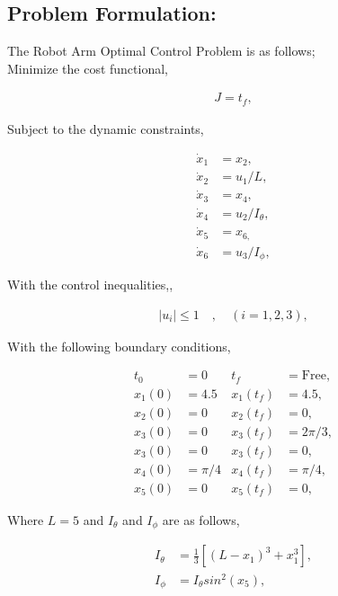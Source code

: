 \documentclass[11pt,usenames]{article}
\begin{document}
	
	\subsection{Problem Formulation:}
	
	The Robot Arm Optimal Control Problem is as follows;\\
	
	Minimize the cost functional,
	
	\begin{align} 
	J = t_{f},
	\end{align}
	
	Subject to the dynamic constraints,
	
	\begin{align}
	\dot x_{1} &= x_{2}, \nonumber\\
	\dot x_{2} &= u_{1}/L, \nonumber\\
	\dot x_{3} &= x_{4},\\
	\dot x_{4} &= u_{2}/I_{\theta}, \nonumber\\
	\dot x_{5} &= x_{6,} \nonumber\\
	\dot x_{6} &= u_{3}/I_{\phi}, \nonumber
	\end{align}
	
	With the control inequalities,,
	
	\begin{align} 
	|u_{i}| \leq 1 \quad , \quad (i=1,2,3),
	\end{align}
	
	With the following boundary conditions,
	
	\begin{align}
	t_{0} &= 0 & t_{f} &= \text{Free}, \nonumber \\
	x_{1}(0) &= 4.5 & x_{1}(t_{f}) &= 4.5, \nonumber \\
	x_{2}(0) &= 0 & x_{2}(t_{f}) &= 0,  \nonumber\\
	x_{3}(0) &= 0 & x_{3}(t_{f}) &= 2\pi/3, \\
	x_{3}(0) &= 0 & x_{3}(t_{f}) &= 0, \nonumber \\
	x_{4}(0) &= \pi/4 & x_{4}(t_{f}) &= \pi/4, \nonumber \\
	x_{5}(0) &= 0 & x_{5}(t_{f}) &= 0, \nonumber 
	\end{align}
	
	Where $L=5$ and $I_{\theta}$ and $I_{\phi}$ are as follows,
	
	\begin{align}
	I_{\theta} &= \frac{1}{3} \left[ \left(  L-x_{1}\right) ^{3} + x_{1}^{3}\right] ,\\
	I_{\phi} &= I_{\theta}sin^{2}(x_{5}), 
	\end{align}
	
\end{document}
